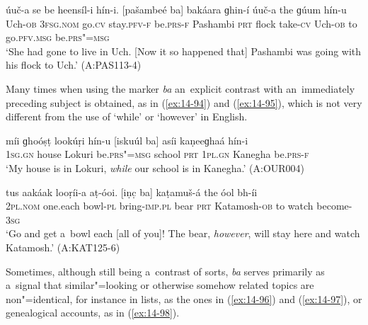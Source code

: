 \begin{exe}
\ex
\label{ex:14-93}
\gll úuč-a se  be heensíl-i  hín-i. [pašambeé ba] bakáara ɡhin-í úuč-a the ɡúum hín-u \\
Uch-\textsc{ob} \textsc{3fsg.nom} go.\textsc{cv} stay.\textsc{pfv-f} be.\textsc{prs-f} Pashambi  \textsc{prt} flock take-\textsc{cv} Uch-\textsc{ob} to go.\textsc{pfv.msg} be.\textsc{prs"=msg} \\
\glt `She had gone to live in Uch. [Now it so happened that] Pashambi was going with his flock to Uch.' (A:PAS113-4)
\end{exe}

Many times when using the marker \textit{ba} an~explicit contrast with an~immediately preceding subject is obtained, as in (\ref{ex:14-94}) and (\ref{ex:14-95}), which is not very different from the use of `while' or `however' in English.

\begin{exe}
\ex
\label{ex:14-94}
\gll míi ɡhoóṣṭ lookúṛi hín-u [iskuúl ba] asíi  kaṇeeɡhaá hín-i \\
\textsc{1sg.gn} house Lokuri be.\textsc{prs"=msg} school \textsc{prt} \textsc{1pl.gn} Kanegha be.\textsc{prs-f } \\
\glt `My house is in Lokuri, \textit{while} our school is in Kanegha.' (A:OUR004)

\ex
\label{ex:14-95}
\gll tus aakáak looṛíi-a aṭ-óoi. [iṇc̣ ba]  kaṭamuš-á the óol bh-íi \\
\textsc{2pl.nom} one.each bowl-\textsc{pl} bring-\textsc{imp.pl} bear \textsc{prt}  Katamosh-\textsc{ob} to watch become-\textsc{3sg } \\
\glt `Go and get a~bowl each [all of you]! The bear, \textit{however}, will stay here and watch Katamosh.' (A:KAT125-6)
\end{exe}

Sometimes, although still being a~contrast of sorts, \textit{ba} serves primarily as a~signal that similar"=looking or otherwise somehow related topics are non"=identical, for instance in lists, as the ones in (\ref{ex:14-96}) and (\ref{ex:14-97}), or genealogical accounts, as in (\ref{ex:14-98}). 

